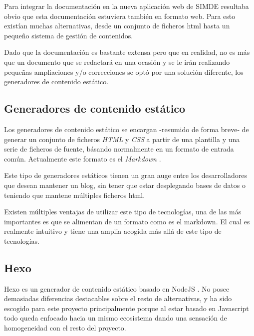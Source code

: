 Para integrar la documentación en la nueva aplicación web de SIMDE resultaba obvio que esta documentación
estuviera también en formato web. Para esto existían muchas alternativas, desde un conjunto de ficheros
html hasta un pequeño sistema de gestión de contenidos. 

\bigskip
Dado que la documentación es bastante extensa pero que en realidad, no es más que un documento 
que se redactará en una ocasión y se le irán realizando pequeñas ampliaciones y/o correcciones
se optó por una solución diferente, los generadores de contenido estático.

\subsection{Generadores de contenido estático}

Los generadores de contenido estático se encargan -resumido de forma breve- de generar 
un conjunto de ficheros \textit{HTML} y \textit{CSS} a partir de una plantilla y una serie 
de ficheros de fuente, básando normalmente en un formato de entrada común. Actualmente
este formato es el \textit{Markdown} \cite{GeneradoresEstaticos}. 

\bigskip
Este tipo de generadores estáticos tienen un gran auge entre los desarrolladores que desean 
mantener un blog, sin tener que estar desplegando bases de datos o teniendo que mantene múltiples
ficheros html. 

\bigskip 
Existen múltiples ventajas de utilizar este tipo de tecnologías, una de las más importantes
 es que se alimentan de un formato como es el markdown. El cual es realmente intuitivo 
 y tiene una amplia acogida más allá de este tipo de tecnologías. 

\subsection{Hexo}

Hexo es un generador de contenido estático basado en NodeJS \cite{Hexo}. 
No posee demasiadas diferencias destacables sobre el resto de alternativas,
y ha sido escogido para este proyecto principalmente porque al estar
basado en Javascript todo queda enfocado hacia un mismo ecosistema dando una 
sensación de homogeneidad con el resto del proyecto.